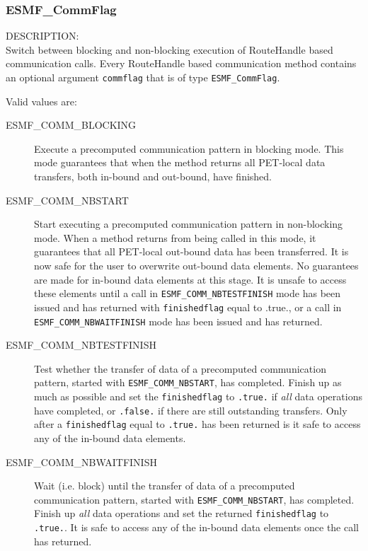 \subsubsection{ESMF\_CommFlag}
\label{opt:commflag}
{\sf DESCRIPTION:\\}  
Switch between blocking and non-blocking execution of RouteHandle based
communication calls. Every RouteHandle based communication method contains
an optional argument {\tt commflag} that is of type {\tt ESMF\_CommFlag}.

Valid values are:
\begin{description}

\item [ESMF\_COMM\_BLOCKING]
         Execute a precomputed communication pattern in blocking mode. This
         mode guarantees that when the method returns all PET-local data
         transfers, both in-bound and out-bound, have finished. 
\item [ESMF\_COMM\_NBSTART]
         Start executing a precomputed communication pattern in non-blocking
         mode. When a method returns from being called in this mode, it
         guarantees that all PET-local out-bound data has been transferred.
         It is now safe for the user to overwrite out-bound data elements.
         No guarantees are made for in-bound data elements at this stage. It is
         unsafe to access these elements until a call in
         {\tt ESMF\_COMM\_NBTESTFINISH} mode has been issued and has returned
         with {\tt finishedflag} equal to .true., or a call in
         {\tt ESMF\_COMM\_NBWAITFINISH} mode has been issued and has returned.
\item [ESMF\_COMM\_NBTESTFINISH]
         Test whether the transfer of data of a precomputed communication
         pattern, started with {\tt ESMF\_COMM\_NBSTART}, has completed.
         Finish up as much as possible and set the {\tt finishedflag} to 
         {\tt .true.} if {\em all} data operations have completed, or
         {\tt .false.} if there are still outstanding transfers. Only after
         a {\tt finishedflag} equal to {\tt .true.} has been returned is it
         safe to access any of the in-bound data elements.
\item [ESMF\_COMM\_NBWAITFINISH]
         Wait (i.e. block) until the transfer of data of a precomputed
         communication pattern, started with {\tt ESMF\_COMM\_NBSTART}, has
         completed. Finish up {\em all} data operations and set the returned 
         {\tt finishedflag} to {\tt .true.}. It is safe to access any of the
         in-bound data elements once the call has returned.
\end{description}

